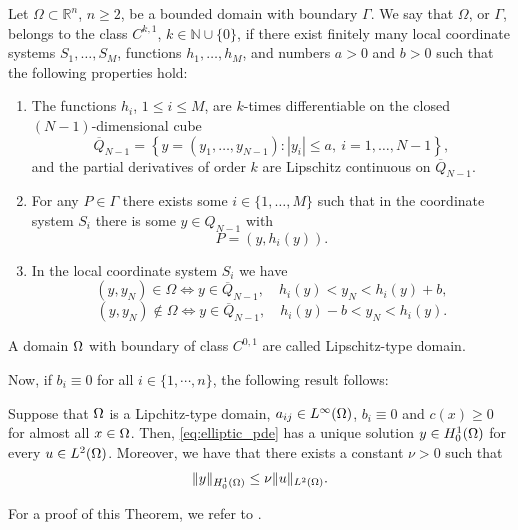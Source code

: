  \begin{definition}
Let $\Omega \subset \mathbb{R}^n$, $n \ge 2$, be a bounded domain with boundary $\Gamma$.
We say that $\Omega$, or $\Gamma$, belongs to the class $C^{k,1}$, $k \in \mathbb{N}\cup\{0\}$,
if there exist finitely many local coordinate systems $S_1,\dots,S_M$,
functions $h_1,\dots,h_M$, and numbers $a>0$ and $b>0$ such that the following
properties hold:
\begin{enumerate}[label=(\roman*)]
\item
The functions $h_i$, $1 \le i \le M$, are $k$-times differentiable on the closed
$(N-1)$-dimensional cube
\[
\overline{Q}_{N-1}
= \left\{ y=(y_1,\dots,y_{N-1}) : |y_i| \le a,\ i=1,\dots,N-1 \right\},
\]
and the partial derivatives of order $k$ are Lipschitz continuous on
$\overline{Q}_{N-1}$.

\item
For any $P \in \Gamma$ there exists some $i \in \{1,\dots,M\}$ such that in the
coordinate system $S_i$ there is some $y \in Q_{N-1}$ with
\[
P = (y, h_i(y)).
\]

\item
In the local coordinate system $S_i$ we have
\[
(y,y_N) \in \Omega
\iff
y \in \overline{Q}_{N-1}, \quad h_i(y) < y_N < h_i(y)+b,
\]
\[
(y,y_N) \notin \Omega
\iff
y \in \overline{Q}_{N-1}, \quad h_i(y)-b < y_N < h_i(y).
\]
\end{enumerate}
\end{definition}

 \begin{definition}
     A domain $\Omega$ with boundary of class $C^{0,1}$ are called Lipschitz-type domain.
 \end{definition} 
 
 Now, if $b_i\equiv 0$ for all $i\in \{1,\cdots,n\}$, the following result follows:

 \begin{theorem}\label{thm:existence_solution_elliptic_pde}
     Suppose that $\Omega$ is a Lipchitz-type domain, $a_{ij}\in L^{\infty}(\Omega)$, $b_i\equiv 0$ and $c(x)\ge 0$ for almost all $x\in \Omega$. Then, \eqref{eq:elliptic_pde} has a unique solution $y\in H_0^1(\Omega)$ for every $u\in L^2(\Omega)$. Moreover, we have that there exists a constant $\nu>0$ such that 
     \begin{equation}\label{eq:state_continuity}    
      \lVert y \rVert_{H_0^1(\Omega)}\le \nu \lVert u \rVert_{L^2(\Omega)}.
     \end{equation}
 \end{theorem}
For a proof of this Theorem, we refer to \cite[Theorem 2.7]{troeltzsch2010}.

